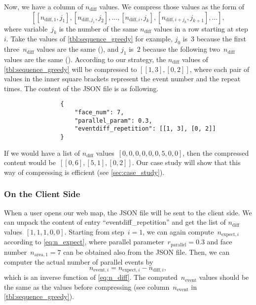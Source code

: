 \documentclass[ijgi,article,submit,moreauthors,pdftex]{Definitions/mdpi}
\begin{document}
Now, we have a column of $n_\mathrm{diff}$ values.
We compress those values as the form of 
$$
[[n_{\mathrm{diff},1},j_1], [n_{\mathrm{diff},j_1},j_2], \ldots, 
[n_{\mathrm{diff},i},j_k], [n_{\mathrm{diff},i+j_k},j_{k+1}], \ldots],
$$
where variable~$j_k$ is the number of the same $n_\mathrm{diff}$ values in a row 
starting at step~$i$.
Take the values of \tbl\ref{tbl:sequence_greedy} for example, 
$j_0$ is~$3$ 
because the first three~$n_\mathrm{diff}$ values are the same (),
and $j_1$ is~$2$ 
because the following two~$n_\mathrm{diff}$ values are the same (). 
According to our strategy, 
the $n_\mathrm{diff}$ values of \tbl\ref{tbl:sequence_greedy}
will be compressed to $[[1,3], [0,2]]$,
where each pair of values in the inner square brackets 
represent the event number and the repeat times.
The content of the JSON file is as following.
\begin{verbatim}
                {
                    "face_num": 7,
                    "parallel_param": 0.3,                    
                    "eventdiff_repetition": [[1, 3], [0, 2]]
                }
\end{verbatim}
If we would have a list of $n_\mathrm{diff}$ values~$[0, 0, 0, 0, 0, 0, 5, 0, 0]$,
then the compressed content would be~$[[0,6], [5,1], [0,2]]$.
Our case study will show that this way of compressing is efficient
(see \sect\ref{sec:case_study}).



\subsubsection{On the Client Side}
\label{sec:snap_client}


When a user opens our web map,
the JSON file will be sent to the client side.
We can unpack the content of entry ``eventdiff\_repetition'' and 
get the list of $n_\mathrm{diff}$ values~$[1, 1, 1, 0, 0]$.
Starting from step~$i=1$,
we can again compute~$n_{\mathrm{expect},i}$ according to \eq\ref{eq:n_expect},
where parallel parameter~$r_\mathrm{parallel}=0.3$ 
and face number~$n_{\mathrm{area},1} = 7$
can be obtained also from the JSON file.
Then, we can computer the actual number of parallel events by
\begin{equation*}
\label{eq:n_event_step}
n_{\mathrm{event},i} = n_{\mathrm{expect},i} - n_{\mathrm{diff},i},
\end{equation*}
which is an inverse function of \eq\ref{eq:n_diff}.
The computed~$n_\mathrm{event}$ values 
should be the same as the values before compressing
(see column~$n_\mathrm{event}$ in \tbl\ref{tbl:sequence_greedy}).
\end{document}
